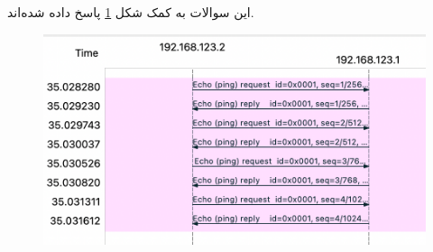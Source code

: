 \newpage
\Question{}
{
	این سوالات به کمک شکل 
	\ref{fig:rtticmp}
	پاسخ داده شده‌اند.
	\begin{figure}[H]
		\centering
		\includegraphics[width=0.7\columnwidth]{Images/rtt_icmp}
		\label{fig:rtticmp}
	\end{figure}

	
	

}
